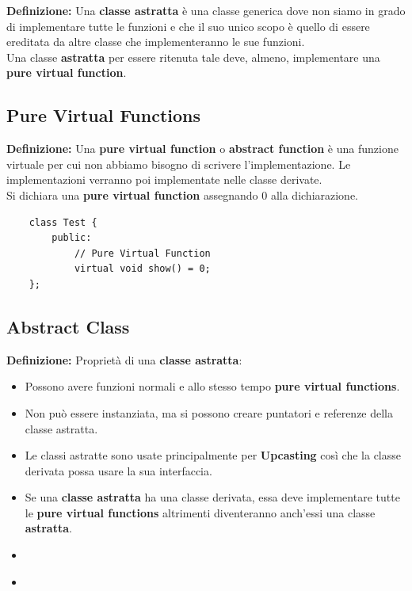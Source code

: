 \textsf{\small \textbf{Definizione: } Una \textbf{classe astratta} è una classe generica dove non siamo in grado di implementare tutte le funzioni e che il suo unico scopo è quello di essere ereditata da altre classe che implementeranno le sue funzioni.} \\

\textsf{\small Una classe \textbf{astratta} per essere ritenuta tale deve, almeno, implementare una \textbf{pure virtual function}.} \\

\subsection{Pure Virtual Functions}

\textsf{\small \textbf{Definizione: } Una \textbf{pure virtual function} o \textbf{abstract function} è una funzione virtuale per cui non abbiamo bisogno di scrivere l'implementazione. Le implementazioni verranno poi implementate nelle classe derivate.} \\

\textsf{\small Si dichiara una \textbf{pure virtual function} assegnando 0 alla dichiarazione.} \\

\begin{lstlisting}
	class Test {
		public:
			// Pure Virtual Function
			virtual void show() = 0;
	};
\end{lstlisting}


\subsection{Abstract Class}

\textsf{\small \textbf{Definizione: } Proprietà di una \textbf{classe astratta}: } \\

\begin{itemize}
	\item \textsf{\small Possono avere funzioni normali e allo stesso tempo \textbf{pure virtual functions}.}
	\item \textsf{\small Non può essere instanziata, ma si possono creare puntatori e referenze della classe astratta.}
	\item \textsf{\small Le classi astratte sono usate principalmente per \textbf{Upcasting} così che la classe derivata possa usare la sua interfaccia.}
	\item \textsf{\small Se una \textbf{classe astratta} ha una classe derivata, essa deve implementare tutte le \textbf{pure virtual functions} altrimenti diventeranno anch'essi una classe \textbf{astratta}.}
	\item \textsf{\small }
	\item \textsf{\small }
\end{itemize}

